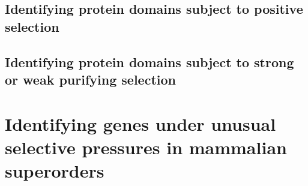 \subsection{Identifying protein domains subject to positive selection}
\subsection{Identifying protein domains subject to strong or weak purifying selection}

\section{Identifying genes under unusual selective pressures in mammalian superorders}

